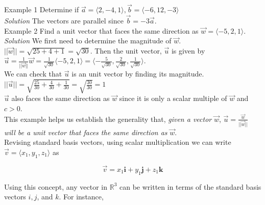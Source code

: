 \documentclass{article}
\begin{document}
            \noindent \color{blue} Example 1 \color{black} Determine if
            $\overrightarrow{a} = \langle 2,-4,1\rangle, \overrightarrow{b}=\langle -6,12,-3\rangle$ \\
            \emph{Solution} The vectors are parallel since $\overrightarrow{b}=-3\overrightarrow{a}$. \\

            \noindent \color{blue} Example 2 \color{black} Find a unit vector that faces the same
            direction as $\overrightarrow{w}=\langle-5,2,1\rangle.$\\
            \emph{Solution} We first need to determine the magnitude of $\overrightarrow{w}$.\\
            $||\overrightarrow{w}||=\sqrt{25+4+1}=\sqrt{30}$.
            Then the unit vector, $\overrightarrow{u}$ is given by\\
            $\overrightarrow{u}=\frac{1}{||\overrightarrow{w}||}\overrightarrow{w}
            =\frac{1}{\sqrt{30}}\langle-5,2,1\rangle=\langle-\frac{5}{\sqrt{30}},
            \frac{2}{\sqrt{30}},\frac{1}{\sqrt{30}}\rangle$.\\
            We can check that $\overrightarrow{u}$ is an unit vector by finding its magnitude.\\
            $||\overrightarrow{u}||=\sqrt{\frac{25}{30}+\frac{4}{30}+\frac{1}{30}}=\sqrt{\frac{30}{30}}=1$\\
            $\overrightarrow{u}$ also faces the same direction as $\overrightarrow{w}$ since it is
            only a scalar multiple of $\overrightarrow{w}$ and $c > 0$.\\

            \noindent This example helps us establish the generality that, \emph{given a vector}
            $\overrightarrow{w}$, $\overrightarrow{u}=\frac{\overrightarrow{w}}{||\overrightarrow{w}||}$
            \emph{will be a unit vector that faces the same direction as} $\overrightarrow{w}$.\\

            \noindent Revising standard basis vectors, using scalar multiplication we can write
            $\overrightarrow{v}=\langle x_1,y_1,z_1\rangle$ as

            \begin{equation*}
                \overrightarrow{v}=x_1\textbf{i}+y_1\textbf{j}+z_1\textbf{k}
            \end{equation*}

            \noindent Using this concept, any vector in $\mathbb{R}^3$ can be written in terms of the
            standard basis vectors $i, j$, and $k$. For instance,
\end{document}
